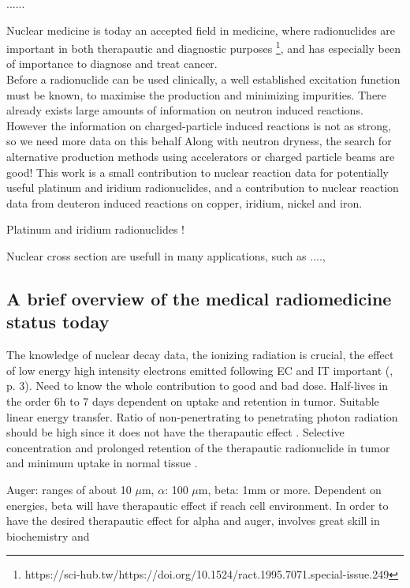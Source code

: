 

......


Nuclear medicine is today an accepted field in medicine, where radionuclides are important in both therapautic and diagnostic purposes \footnote{https://sci-hub.tw/https://doi.org/10.1524/ract.1995.7071.special-issue.249}, and has especially  been of importance to diagnose and treat cancer. \\ 

Before a radionuclide can be used clinically, a well established excitation function must be known, to maximise the production and minimizing impurities. There already exists large amounts of information on neutron induced reactions. However the information on charged-particle induced reactions is not as strong, so we need more data on this behalf  Along with neutron dryness, the search for alternative production methods using accelerators or charged particle beams are good!  
This work is a small contribution to nuclear reaction data for potentially useful platinum and iridium radionuclides, and a contribution to nuclear reaction data from deuteron induced reactions on copper, iridium, nickel and iron. 

Platinum and iridium radionuclides ! 

Nuclear cross section are usefull in many applications, such as ...., 


\subsection{A brief overview of the medical radiomedicine status today }

The knowledge of nuclear decay data, the ionizing radiation is crucial, the effect of low energy high intensity electrons emitted following EC and IT important (\cite{international2012iaea}, p. 3). Need to know the whole contribution to good and bad dose. Half-lives in the order 6h to 7 days dependent on uptake and retention in tumor. Suitable linear energy transfer. Ratio of non-penertrating to penetrating photon radiation should be high since it does not have the therapautic effect \cite{international2012iaea, p. 1}. Selective concentration and prolonged retention of the therapautic radionuclide in tumor and minimum uptake in normal tissue \cite{international2012iaea, p. 2}. 

Auger: ranges of about 10 $\mu$m, $\alpha$: 100 $\mu$m, beta: 1mm or more. Dependent on energies, beta will have therapautic effect if reach cell environment. In order to have the desired therapautic effect for alpha and auger, involves great skill in biochemistry and 

